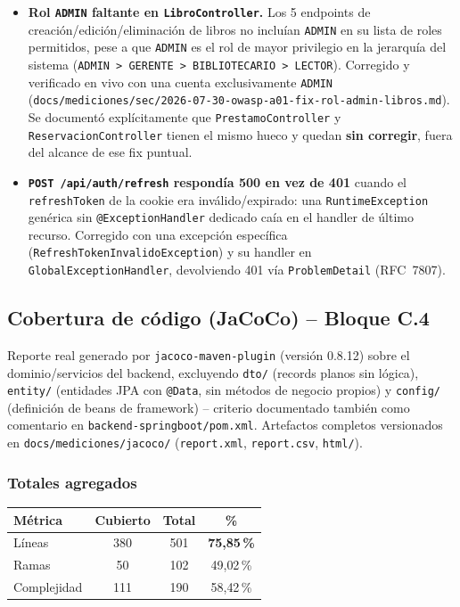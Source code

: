 \documentclass[12pt,a4paper]{article}
\begin{document}
\begin{itemize}[leftmargin=1.2cm]
  \item \textbf{Rol \texttt{ADMIN} faltante en \texttt{LibroController}.}
    Los 5 endpoints de creación/edición/eliminación de libros no incluían
    \texttt{ADMIN} en su lista de roles permitidos, pese a que
    \texttt{ADMIN} es el rol de mayor privilegio en la jerarquía del
    sistema (\texttt{ADMIN > GERENTE > BIBLIOTECARIO > LECTOR}). Corregido
    y verificado en vivo con una cuenta exclusivamente \texttt{ADMIN}
    (\texttt{docs/mediciones/sec/2026-07-30-owasp-a01-fix-rol-admin-libros.md}).
    Se documentó explícitamente que \texttt{PrestamoController} y
    \texttt{ReservacionController} tienen el mismo hueco y quedan
    \textbf{sin corregir}, fuera del alcance de ese fix puntual.
  \item \textbf{\texttt{POST /api/auth/refresh} respondía 500 en vez de
    401} cuando el \texttt{refreshToken} de la cookie era
    inválido/expirado: una \texttt{RuntimeException} genérica sin
    \texttt{@ExceptionHandler} dedicado caía en el handler de último
    recurso. Corregido con una excepción específica
    (\texttt{RefreshTokenInvalidoException}) y su handler en
    \texttt{GlobalExceptionHandler}, devolviendo 401 vía
    \texttt{ProblemDetail} (RFC~7807).
\end{itemize}

\subsection{Cobertura de código (JaCoCo) -- Bloque C.4}

Reporte real generado por \texttt{jacoco-maven-plugin} (versión 0.8.12)
sobre el dominio/servicios del backend, excluyendo \texttt{dto/}
(records planos sin lógica), \texttt{entity/} (entidades JPA con
\texttt{@Data}, sin métodos de negocio propios) y \texttt{config/}
(definición de beans de framework) -- criterio documentado también como
comentario en \texttt{backend-springboot/pom.xml}. Artefactos completos
versionados en \texttt{docs/mediciones/jacoco/} (\texttt{report.xml},
\texttt{report.csv}, \texttt{html/}).

\subsubsection*{Totales agregados}

\begin{center}
\begin{tabular}{|l|c|c|c|}
\hline
\rowcolor{verdeuteq}
\color{white}\textbf{Métrica} & \color{white}\textbf{Cubierto} & \color{white}\textbf{Total} & \color{white}\textbf{\%} \\
\hline
Líneas & 380 & 501 & \textbf{75{,}85\,\%} \\
Ramas & 50 & 102 & 49{,}02\,\% \\
Complejidad & 111 & 190 & 58{,}42\,\% \\
\hline
\end{tabular}
\end{center}
\end{document}
